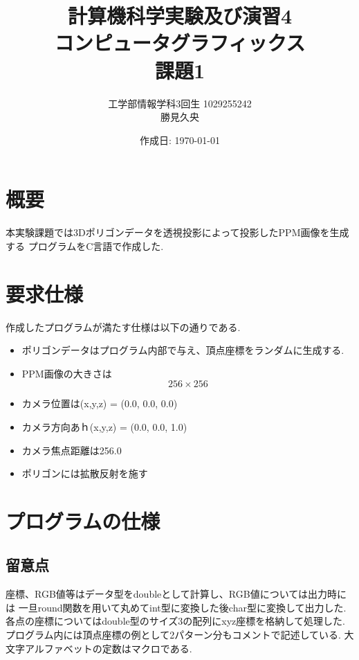 \documentclass[a4j,dvipdfmx]{jsarticle}
\begin{document}
\title{計算機科学実験及び演習4\\コンピュータグラフィックス\\課題1}
\author{工学部情報学科3回生 1029255242\\勝見久央}
\date{作成日: \today} %
\maketitle
\section{概要}
本実験課題では3Dポリゴンデータを透視投影によって投影したPPM画像を生成する
プログラムをC言語で作成した.

\section{要求仕様}
作成したプログラムが満たす仕様は以下の通りである.
\begin{itemize}
\item ポリゴンデータはプログラム内部で与え、頂点座標をランダムに生成する.
\item PPM画像の大きさは$$256 \times 256$$
\item カメラ位置は(x,y,z) = (0.0, 0.0, 0.0)
\item カメラ方向あｈ(x,y,z) = (0.0, 0.0, 1.0)
\item カメラ焦点距離は256.0
\item ポリゴンには拡散反射を施す
\end{itemize}

\section{プログラムの仕様}
\subsection{留意点}
座標、RGB値等はデータ型をdoubleとして計算し、RGB値については出力時には
一旦round関数を用いて丸めてint型に変換した後char型に変換して出力した.
各点の座標についてはdouble型のサイズ3の配列にxyz座標を格納して処理した.
プログラム内には頂点座標の例として2パターン分もコメントで記述している.
大文字アルファベットの定数はマクロである.
\end{document}
